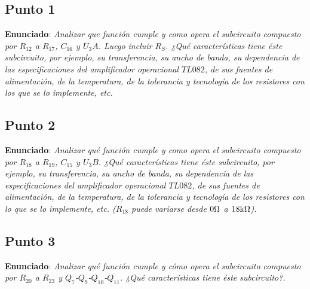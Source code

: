 
\subsection{Punto 1}

\textbf{Enunciado}: \textsl{Analizar que función cumple y como opera el subcircuito compuesto por $R_{12}$ a $R_{17}$, $C_{16}$ y $U_{3}A$. Luego incluir $R_{S}$. ¿Qué características tiene éste subcircuito, por ejemplo, su transferencia, su ancho de banda, su dependencia de las especificaciones del amplificador operacional $TL082$, de sus fuentes de alimentación, de la temperatura, de la tolerancia y tecnología de los resistores con los que se lo implemente, etc.}



\subsection{Punto 2}

\textbf{Enunciado}: \textsl{Analizar qué función cumple y como opera el subcircuito compuesto por $R_{18}$ a $R_{19}$, $C_{15}$ y $U_{3}B$. ¿Qué características tiene éste subcircuito, por ejemplo, su transferencia, su ancho de banda, su dependencia de las especificaciones del amplificador operacional $TL082$, de sus fuentes de alimentación, de la temperatura, de la tolerancia y tecnología de los resistores con lo que se lo implemente, etc. ($R_{18}$ puede variarse desde $0 \si[per-mode=symbol]{\ohm}$ a $18 \si[per-mode=symbol]{\kilo\ohm}$).}



\subsection{Punto 3}

\textbf{Enunciado}: \textsl{Analizar qué función cumple y cómo opera el subcircuito compuesto por $R_{20}$ a $R_{23}$ y $Q_{7}$-$Q_{9}$-$Q_{10}$-$Q_{11}$. ¿Qué características tiene éste subcircuito?.}


